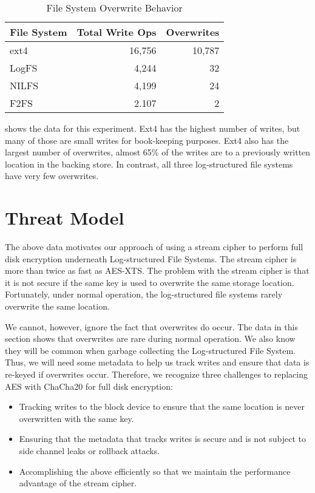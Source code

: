 \begin{table}[th]
\caption{File System Overwrite Behavior}
\label{tbl:overwrites}
\footnotesize
\centering
\begin{tabular}{lrr} 
  \textbf{File System} & \textbf{Total Write Ops} & \textbf{Overwrites}  \\
  \hline
  \hline
  ext4    &  16,756 & 10,787\\
  LogFS   &   4,244 &     32\\
  NILFS   &   4,199 &     24\\
  F2FS    &   2.107 &      2\\
  \hline 
  \hline
\end{tabular}
\end{table}

 shows the data for this experiment.  Ext4 has the
highest number of writes, but many of those are small writes for
book-keeping purposes.  Ext4 also has the largest number of
overwrites, almost 65\% of the writes are to a previously written
location in the backing store.  In contrast, all three log-structured
file systems have very few overwrites.

\section{Threat Model}

The above data motivates our approach of using a stream cipher to
perform full disk encryption underneath Log-structured File Systems.
The stream cipher is more than twice as fast as AES-XTS.  The problem
with the stream cipher is that it is not secure if the same key is
used to overwrite the same storage location.  Fortunately, under
normal operation, the log-structured file systems rarely overwrite the
same location.

We cannot, however, ignore the fact that overwrites do occur.  The
data in this section shows that overwrites are rare during normal
operation.  We also know they will be common when garbage collecting
the Log-structured File System.  Thus, we will need some metadata to
help us track writes and ensure that data is re-keyed if overwrites
occur.  Therefore, we recognize three challenges to replacing AES with
ChaCha20 for full disk encryption:

\begin{itemize}
\item Tracking writes to the block device to ensure that the same
  location is never overwritten with the same key.
\item Ensuring that the metadata that tracks writes is secure and is
  not subject to side channel leaks or rollback attacks.
\item Accomplishing the above efficiently so that we maintain the
  performance advantage of the stream cipher.
\end{itemize}

